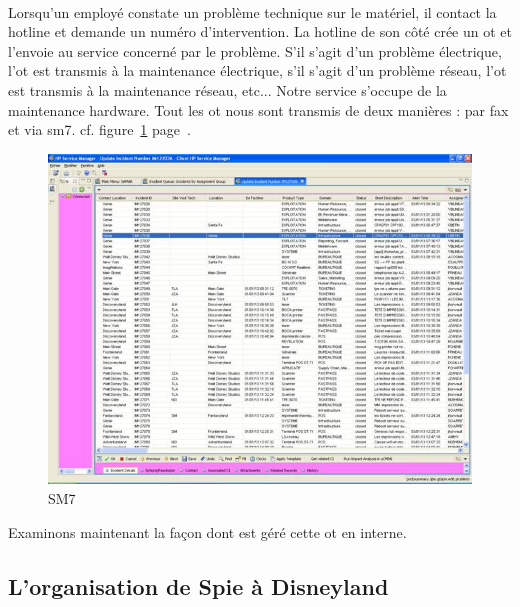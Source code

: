 \paragraph{}
Lorsqu'un employé constate un problème technique sur le matériel, il contact la \foreignlanguage{english}{hotline} et demande un numéro d'intervention. La \foreignlanguage{english}{hotline} de son côté crée un \gls{ot} et l'envoie au service concerné par le problème.
S'il s'agit d'un problème électrique, l'\gls{ot} est transmis à la maintenance électrique, s'il s'agit d'un problème réseau, l'\gls{ot} est transmis à la maintenance réseau, etc...
Notre service s'occupe de la maintenance \gls{hardware}. Tout les \gls{ot} nous sont transmis de deux manières : par fax et via \gls{sm7}. cf. figure~\ref{sm7ListeOt} page~\pageref{sm7ListeOt}.
\begin{center}
  \begin{figure}[ht]
    \caption{\label{sm7ListeOt} SM7}
    \includegraphics [width=1\textwidth]{images/sm7ListeOt.jpg}
  \end{figure}
\end{center}
Examinons maintenant la façon dont est géré cette \gls{ot} en interne.

\subsection{L'organisation de Spie à Disneyland}%
